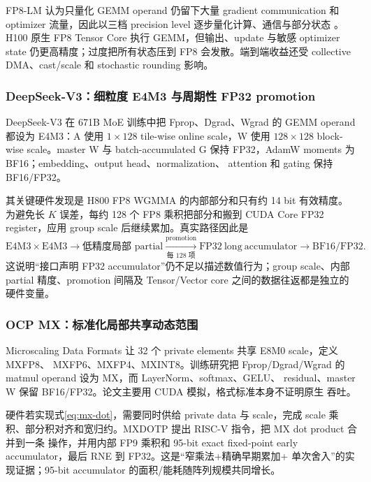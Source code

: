 FP8-LM 认为只量化 GEMM operand 仍留下大量 gradient communication 和 optimizer
流量，因此以三档 precision level 逐步量化计算、通信与部分状态
。H100 原生 FP8 Tensor Core 执行
GEMM，但输出、update 与敏感 optimizer state 仍更高精度；过度把所有状态压到 FP8
会发散。端到端收益还受 collective DMA、cast/scale 和 stochastic rounding 影响。

\subsubsection{DeepSeek-V3：细粒度 E4M3 与周期性 FP32 promotion}

DeepSeek-V3 在 671B MoE 训练中把 Fprop、Dgrad、Wgrad 的 GEMM operand 都设为
E4M3：A 使用 $1\times128$ tile-wise online scale，W 使用 $128\times128$ block-wise
scale。master W 与 batch-accumulated
G 保持 FP32，AdamW moments 为 BF16；embedding、output head、normalization、
attention 和 gating 保持 BF16/FP32。

其关键硬件发现是 H800 FP8 WGMMA 的内部部分和只有约 14 bit 有效精度。为避免长
$K$ 误差，每约 128 个 FP8 乘积把部分和搬到 CUDA Core FP32 register，应用 group
scale 后继续累加。真实路径因此是
\begin{equation}
  \mathrm{E4M3}\times\mathrm{E4M3}
  \rightarrow \text{低精度局部 partial}
  \xrightarrow[\text{每 128 项}]{\text{promotion}}
  \mathrm{FP32\ long\ accumulator}
  \rightarrow \mathrm{BF16/FP32}.
  \label{eq:deepseek-fp8-path}
\end{equation}
这说明“接口声明 FP32 accumulator”仍不足以描述数值行为；group scale、内部 partial
精度、promotion 间隔及 Tensor/Vector core 之间的数据往返都是独立的硬件变量。

\subsubsection{OCP MX：标准化局部共享动态范围}

Microscaling Data Formats 让 32 个 private elements 共享 E8M0 scale，定义 MXFP8、
MXFP6、MXFP4、MXINT8。训练研究把
Fprop/Dgrad/Wgrad 的 matmul operand 设为 MX，而 LayerNorm、softmax、GELU、
residual、master W 保留 BF16/FP32。论文主要用 CUDA 模拟，格式标准本身不证明原生
吞吐。

硬件若实现式\eqref{eq:mx-dot}，需要同时供给 private data 与 scale，完成 scale
乘积、部分积对齐和宽归约。MXDOTP 提出 RISC-V 指令，把 MX dot product 合并到一条
操作，并用内部 FP9 乘积和 95-bit exact fixed-point early accumulator，最后 RNE
到 FP32。这是“窄乘法+精确早期累加+
单次舍入”的实现证据；95-bit accumulator 的面积/能耗随阵列规模共同增长。


